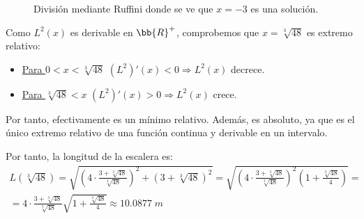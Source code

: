 \begin{ejercicio}
    \begin{figure}[H]
        \centering
        \caption{División mediante Ruffini donde se ve que $x=-3$ es una solución.}
        \label{Fig:Ej11:DivRuffini}
    \end{figure}

    Como $L^2(x)$ es derivable en $\bb{R}^+$, comprobemos que $x= \sqrt[3]{48}$ es extremo relativo:
    \begin{itemize}
        \item \underline{Para $0<x<\sqrt[3]{48}$} $(L^2)'(x)<0 \Longrightarrow L^2(x)$ decrece.
        \item \underline{Para $\sqrt[3]{48}<x$} $(L^2)'(x)>0 \Longrightarrow L^2(x)$ crece.
    \end{itemize}

    Por tanto, efectivamente es un mínimo relativo. Además, es absoluto, ya que es el único extremo relativo de una función continua y derivable en un intervalo.

    Por tanto, la longitud de la escalera es:
    \begin{multline*}
        L(\sqrt[3]{48}) = \sqrt{\left(4\cdot \frac{3+\sqrt[3]{48}}{\sqrt[3]{48}}\right)^2 + (3+\sqrt[3]{48})^2}
        = \sqrt{\left(4\cdot \frac{3+\sqrt[3]{48}}{\sqrt[3]{48}}\right)^2\left(1+\frac{\sqrt[3]{48}}{4}\right)}
        =\\= 4\cdot \frac{3+\sqrt[3]{48}}{\sqrt[3]{48}}\sqrt{1+\frac{\sqrt[3]{48}}{4}} \approx 10.0877\;m
    \end{multline*}        
\end{ejercicio}

